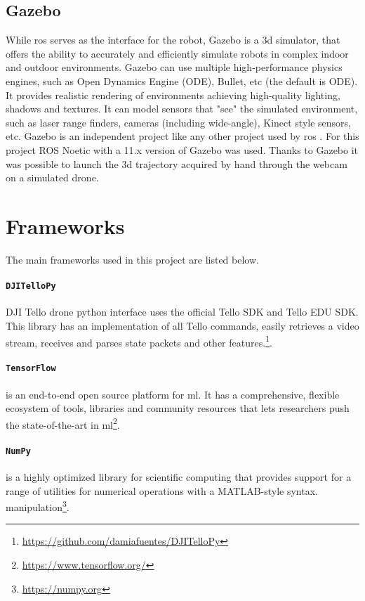 \subsection{Gazebo}
\label{subsec:gazebo}
\noindent While \gls{ros} serves as the interface for the robot, Gazebo is a \gls{3d} simulator, that offers the ability to accurately and efficiently simulate robots in complex indoor and outdoor environments. Gazebo can use multiple high-performance physics engines, such as Open Dynamics Engine (ODE), Bullet, etc (the default is ODE). It provides realistic rendering of environments achieving high-quality lighting, shadows and textures. It can model sensors that "see" the simulated environment, such as laser range finders, cameras (including wide-angle), Kinect style sensors, etc. Gazebo is an independent project like any other project used by \gls{ros} \cite{Gazebosi92:online}. For this project ROS Noetic with a 11.x version of Gazebo was used. Thanks to Gazebo it was possible to launch the \gls{3d} trajectory acquired by hand through the webcam on a simulated drone. 

\section{Frameworks}
\label{subsec:frameworks}
The main frameworks used in this project are listed below.

\paragraph*{\texttt{DJITelloPy}} DJI Tello drone python interface uses the official Tello SDK and Tello EDU SDK. This library has an implementation of all Tello commands, easily retrieves a video stream, receives and parses state packets and other features.\footnote{\url{https://github.com/damiafuentes/DJITelloPy}}.

\paragraph*{\texttt{TensorFlow}} is an end-to-end open source platform for \gls{ml}. It has a comprehensive, flexible ecosystem of tools, libraries and community resources that lets researchers push the state-of-the-art in \gls{ml}\footnote{\url{https://www.tensorflow.org/}}.

\paragraph*{\texttt{NumPy}} is a highly optimized library for scientific computing that provides support for a range of utilities for numerical operations with a MATLAB-style syntax. manipulation\footnote{\url{https://numpy.org}}.

